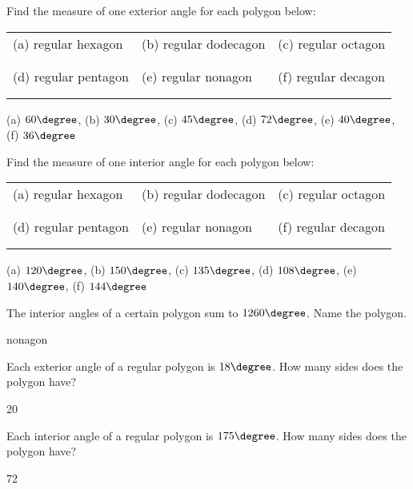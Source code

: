 \begin{exercises}
	\newpage
	
	\begin{ex}
	\e Find the measure of one exterior angle for each polygon below:
	
	\begin{tabular}{p{3.5cm} p{4cm} p{3.5cm} }
	(a) regular hexagon & (b) regular dodecagon & (c) regular octagon \\\\\\
	(d) regular pentagon & (e) regular nonagon & (f) regular decagon \\\\\\
	\end{tabular}
	\begin{sol}
	(a) $60\degree$, (b) $30\degree$, (c) $45\degree$,
	(d) $72\degree$, (e) $40\degree$, (f) $36\degree$	
	\end{sol}
	\end{ex}
	
	\begin{ex}
	\e Find the measure of one interior angle for each polygon below:
	
	\begin{tabular}{p{3.5cm} p{4cm} p{3.5cm} }
	(a) regular hexagon & (b) regular dodecagon & (c) regular octagon \\\\\\
	(d) regular pentagon & (e) regular nonagon & (f) regular decagon \\\\\\
	\end{tabular}
	\begin{sol}
	(a) $120\degree$, (b) $150\degree$, (c) $135\degree$,
	(d) $108\degree$, (e) $140\degree$, (f) $144\degree$	
	\end{sol}
	\end{ex}

	\begin{ex}
	\e The interior angles of a certain polygon sum to $1260\degree$. 
	Name the polygon.
	\begin{sol}
	nonagon
	\end{sol}
	\end{ex}
	
	\medskip

	\begin{ex}
	\e Each exterior angle of a regular polygon is $18\degree$.
	How many sides does the polygon have?
	\begin{sol}
	20
	\end{sol}
	\end{ex}
	
	\medskip

	\begin{ex}
	\e Each interior angle of a regular polygon is $175\degree$.
	How many sides does the polygon have?
	\begin{sol}
	72
	\end{sol}
	\end{ex}
	
	\medskip

\end{exercises}

